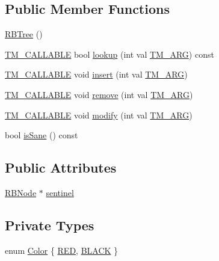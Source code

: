 \subsection*{Public Member Functions}
\begin{DoxyCompactItemize}
\item 
\hyperlink{classRBTree_a19921f34f32f777bb3c4b85d4ff1d9de}{R\-B\-Tree} ()
\item 
\hyperlink{tm_8h_adf0341d9b0d169f1aba20257caed702e}{T\-M\-\_\-\-C\-A\-L\-L\-A\-B\-L\-E} bool \hyperlink{classRBTree_ac08a215acdc2f4ccecebaafbbe1dce41}{lookup} (int val \hyperlink{tm_8h_a030f4350a175fed7a99c242cbaa53258}{T\-M\-\_\-\-A\-R\-G}) const 
\item 
\hyperlink{tm_8h_adf0341d9b0d169f1aba20257caed702e}{T\-M\-\_\-\-C\-A\-L\-L\-A\-B\-L\-E} void \hyperlink{classRBTree_abbb72e04b9cc677051094c3839ca09ab}{insert} (int val \hyperlink{tm_8h_a030f4350a175fed7a99c242cbaa53258}{T\-M\-\_\-\-A\-R\-G})
\item 
\hyperlink{tm_8h_adf0341d9b0d169f1aba20257caed702e}{T\-M\-\_\-\-C\-A\-L\-L\-A\-B\-L\-E} void \hyperlink{classRBTree_a98d0db9e5d36729c5b35b2a40e959856}{remove} (int val \hyperlink{tm_8h_a030f4350a175fed7a99c242cbaa53258}{T\-M\-\_\-\-A\-R\-G})
\item 
\hyperlink{tm_8h_adf0341d9b0d169f1aba20257caed702e}{T\-M\-\_\-\-C\-A\-L\-L\-A\-B\-L\-E} void \hyperlink{classRBTree_afbd6f00d7eab72aaaf6d2a0a6074ba36}{modify} (int val \hyperlink{tm_8h_a030f4350a175fed7a99c242cbaa53258}{T\-M\-\_\-\-A\-R\-G})
\item 
bool \hyperlink{classRBTree_abb5ba484adb7e85adc371565c64c87fc}{is\-Sane} () const 
\end{DoxyCompactItemize}
\subsection*{Public Attributes}
\begin{DoxyCompactItemize}
\item 
\hyperlink{structRBTree_1_1RBNode}{R\-B\-Node} $\ast$ \hyperlink{classRBTree_a925ac29b01acd36d02015a0588a2f076}{sentinel}
\end{DoxyCompactItemize}
\subsection*{Private Types}
\begin{DoxyCompactItemize}
\item 
enum \hyperlink{classRBTree_ad97759567366df7c32635987b1c1cf3f}{Color} \{ \hyperlink{classRBTree_ad97759567366df7c32635987b1c1cf3faeba8d385c6aba6ed845392e9155f4f3b}{R\-E\-D}, 
\hyperlink{classRBTree_ad97759567366df7c32635987b1c1cf3fa4f983a00dbc34921b98ad8f47c8ed5b5}{B\-L\-A\-C\-K}
 \}
\end{DoxyCompactItemize}
